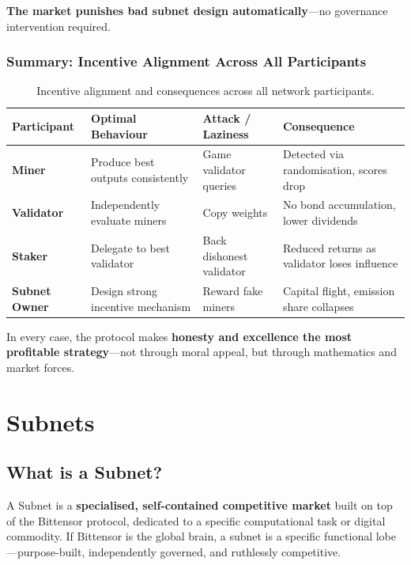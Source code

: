 \documentclass[12pt, a4paper, oneside]{report}
\theoremstyle{definition}
\begin{document}
\textbf{The market punishes bad subnet design automatically}—no governance 
intervention required.

\subsection{Summary: Incentive Alignment Across All Participants}

\begin{table}[H]
\centering
\renewcommand{\arraystretch}{1.8}
\begin{tabular}{p{2.8cm} p{3.5cm} p{3.5cm} p{3.5cm}}
\toprule
\textbf{Participant} & \textbf{Optimal Behaviour} & \textbf{Attack / Laziness} 
& \textbf{Consequence} \\
\midrule
\textbf{Miner} & Produce best outputs consistently & Game validator queries 
& Detected via randomisation, scores drop \\
\textbf{Validator} & Independently evaluate miners & Copy weights 
& No bond accumulation, lower dividends \\
\textbf{Staker} & Delegate to best validator & Back dishonest validator 
& Reduced returns as validator loses influence \\
\textbf{Subnet Owner} & Design strong incentive mechanism & Reward fake miners 
& Capital flight, emission share collapses \\
\bottomrule
\end{tabular}
\caption{Incentive alignment and consequences across all network participants.}
\label{tab:incentives}
\end{table}

\noindent In every case, the protocol makes \textbf{honesty and excellence the 
most profitable strategy}—not through moral appeal, but through mathematics and 
market forces.






\chapter{Subnets}
\label{chap:subnets}

\section{What is a Subnet?}

A Subnet is a \textbf{specialised, self-contained competitive market} built on 
top of the Bittensor protocol, dedicated to a specific computational task or 
digital commodity. If Bittensor is the global brain, a subnet is a specific 
functional lobe—purpose-built, independently governed, and ruthlessly competitive.\\[0.4cm]
\end{document}
